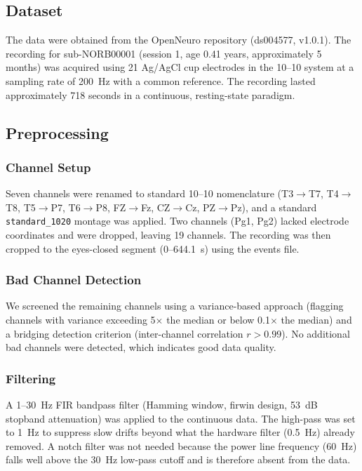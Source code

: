 \documentclass[10pt, a4paper, twocolumn]{article}
\begin{document}
\subsection{Dataset}

The data were obtained from the OpenNeuro repository (ds004577, v1.0.1). The recording for sub-NORB00001 (session 1, age 0.41 years, approximately 5 months) was acquired using 21 Ag/AgCl cup electrodes in the 10--10 system at a sampling rate of 200~Hz with a common reference. The recording lasted approximately 718 seconds in a continuous, resting-state paradigm.

\subsection{Preprocessing}

\subsubsection{Channel Setup}

Seven channels were renamed to standard 10--10 nomenclature (T3$\to$T7, T4$\to$T8, T5$\to$P7, T6$\to$P8, FZ$\to$Fz, CZ$\to$Cz, PZ$\to$Pz), and a standard \texttt{standard\_1020} montage was applied. Two channels (Pg1, Pg2) lacked electrode coordinates and were dropped, leaving 19 channels. The recording was then cropped to the eyes-closed segment (0--644.1~s) using the events file.

\subsubsection{Bad Channel Detection}

We screened the remaining channels using a variance-based approach (flagging channels with variance exceeding 5$\times$ the median or below 0.1$\times$ the median) and a bridging detection criterion (inter-channel correlation $r > 0.99$). No additional bad channels were detected, which indicates good data quality.

\subsubsection{Filtering}

A 1--30~Hz FIR bandpass filter (Hamming window, firwin design, 53~dB stopband attenuation) was applied to the continuous data. The high-pass was set to 1~Hz to suppress slow drifts beyond what the hardware filter (0.5~Hz) already removed. A notch filter was not needed because the power line frequency (60~Hz) falls well above the 30~Hz low-pass cutoff and is therefore absent from the data.
\end{document}
